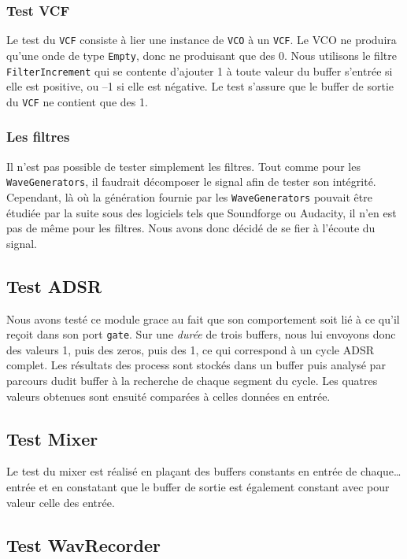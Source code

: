 \subsubsection{Test VCF}

Le test du \verb!VCF! consiste à lier une instance de \verb!VCO! à
un \verb!VCF!. Le VCO ne produira qu'une onde de type \verb!Empty!,
donc ne produisant que des 0. Nous utilisons le filtre
\verb!FilterIncrement! qui se contente d'ajouter 1 à toute valeur
du buffer s'entrée si elle est positive, ou --1 si elle est
négative. Le test s'assure que le buffer de sortie du \verb!VCF! ne
contient que des 1.

\subsubsection{Les filtres}

Il n'est pas possible de tester simplement les filtres. Tout comme
pour les \verb!WaveGenerators!, il faudrait décomposer le signal
afin de tester son intégrité. Cependant, là où la génération
fournie par les \verb!WaveGenerators! pouvait être étudiée par la
suite sous des logiciels tels que Soundforge ou Audacity, il n'en
est pas de même pour les filtres. Nous avons donc décidé de se fier
à l'écoute du signal.

\subsection{Test ADSR}

Nous avons testé ce module grace au fait que son comportement soit lié à ce qu'il reçoit dans son port \texttt{gate}. Sur une \textit{durée} de trois buffers, nous lui envoyons donc des valeurs 1, puis des zeros, puis des 1, ce qui correspond à un cycle ADSR complet. Les résultats des \og{}process\fg{} sont stockés dans un buffer puis analysé par parcours dudit buffer à la recherche de chaque segment du cycle. Les quatres valeurs obtenues sont ensuité comparées à celles données en entrée.


\subsection{Test Mixer}

Le test du mixer est réalisé en plaçant des buffers constants en entrée de chaque\dots entrée et en constatant que le buffer de sortie est également constant avec pour valeur celle des entrée.


\subsection{Test WavRecorder}

